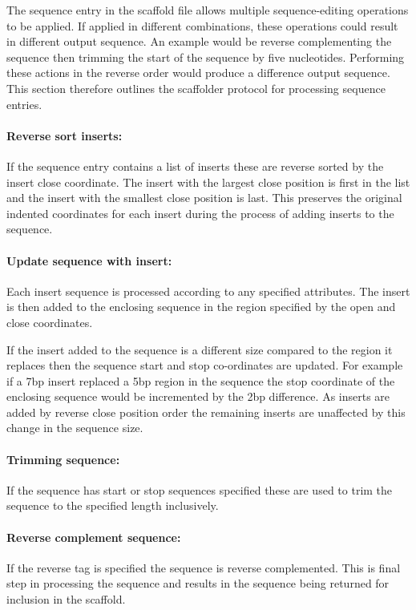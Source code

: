 \documentclass[10pt]{bmc_article}
\newenvironment{bmcformat}{\begin{raggedright}\baselineskip20pt\sloppy\setboolean{publ}{false}}{\end{raggedright}\baselineskip20pt\sloppy}
\begin{document}
\begin{bmcformat}
The sequence entry in the scaffold file allows multiple sequence-editing
operations to be applied. If applied in different combinations, these
operations could result in different output sequence. An example would be
reverse complementing the sequence then trimming the start of the sequence by
five nucleotides. Performing these actions in the reverse order would produce
a difference output sequence. This section therefore outlines the scaffolder
protocol for processing sequence entries. \pb

\paragraph{Reverse sort inserts:} If the sequence entry contains a list of
inserts these are reverse sorted by the insert close coordinate. The insert
with the largest close position is first in the list and the insert with the
smallest close position is last. This preserves the original indented
coordinates for each insert during the process of adding inserts to the
sequence. \pb

\paragraph{Update sequence with insert:} Each insert sequence is processed
according to any specified attributes. The insert is then added to the
enclosing sequence in the region specified by the open and close coordinates.
\pb

If the insert added to the sequence is a different size compared to the region
it replaces then the sequence start and stop co-ordinates are updated.  For
example if a 7bp insert replaced a 5bp region in the sequence the stop
coordinate of the enclosing sequence would be incremented by the 2bp
difference. As inserts are added by reverse close position order the remaining
inserts are unaffected by this change in the sequence size. \pb

\paragraph{Trimming sequence:} If the sequence has start or stop sequences
specified these are used to trim the sequence to the specified length
inclusively. \pb 

\paragraph{Reverse complement sequence:} If the reverse tag is specified the
sequence is reverse complemented. This is final step in processing the sequence
and results in the sequence being returned for inclusion in the scaffold. \pb


\end{bmcformat}
\end{document}
